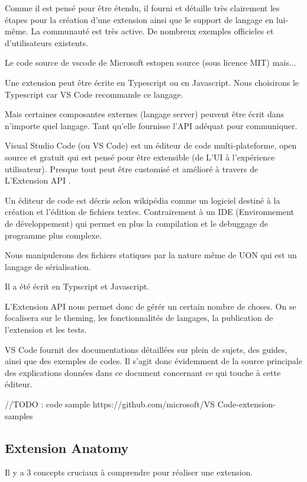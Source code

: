 \documentclass[
    iict, %
    il, %
]{heig-tb}
\begin{document}
Comme il est pensé pour être étendu, il fourni et détaille très clairement les étapes pour la création d'une extension ainsi que le support de langage en lui-même.
La communauté est très active.
De nombreux exemples officieles et d'utilisateurs existents.

Le code source de vscode de Microsoft estopen source (sous licence MIT) mais...

Une extension peut être écrite en Typescript ou en Javascript.
Nous choisirons le Typescript car VS Code recommande ce langage.

Mais certaines composantes externes (langage server) peuvent être écrit dans n'importe quel langage. Tant qu'elle fournisse l'API adéquat pour communiquer.




Visual Studio Code (ou VS Code) est un éditeur de code multi-plateforme, open source et gratuit qui est pensé pour être extensible (de L'UI à l'expérience utilisateur).
Presque tout peut être customisé et amélioré à travers de L'Extension API \cite{extension-api}.



Un éditeur de code est décris selon wikipédia comme un logiciel destiné à la création et l'édition de fichiers textes.
Contrairement à un IDE (Environnement de développement) qui permet en plus la compilation et le debuggage de programme plus complexe.

Nous manipulerons des fichiers statiques par la nature même de UON qui est un langage de sérialisation.




Il a été écrit en Typscript et Javascript.

L'Extension API nous permet donc de gérér un certain nombre de choses.
On se focalisera sur le theming, les fonctionnalités de langages, la publication de l'extension et les tests.

VS Code fournit des documentations détaillées sur plein de sujets, des guides, ainsi que des exemples de codes.
Il s'agit donc évidemment de la source principale des explications données dans ce document concernant ce qui touche à cette éditeur.

//TODO : code sample https://github.com/microsoft/VS Code-extension-samples

\subsection{Extension Anatomy}
Il y a 3 concepts cruciaux à comprendre pour réaliser une extension.
\end{document}
